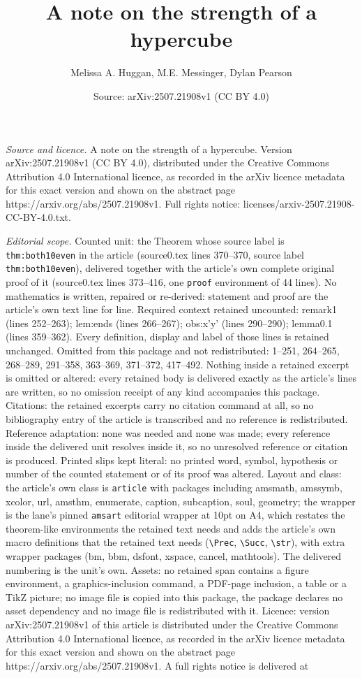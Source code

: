 \documentclass[10pt,a4paper]{amsart}
\title[A note on the strength of a hypercube]{A note on the strength of a hypercube}
\author{Melissa A. Huggan, M.E. Messinger, Dylan Pearson}
\date{Source: arXiv:2507.21908v1 (CC BY 4.0)}
\begin{document}
\maketitle

\noindent\emph{Source and licence.} A note on the strength of a hypercube. Version arXiv:2507.21908v1 (CC BY 4.0), distributed under the Creative Commons Attribution 4.0 International licence, as recorded in the arXiv licence metadata for this exact version and shown on the abstract page https://arxiv.org/abs/2507.21908v1. Full rights notice: licenses/arxiv-2507.21908-CC-BY-4.0.txt.\par\smallskip

\noindent\textit{Editorial scope.} Counted unit: the Theorem whose source label is \texttt{thm:both10even} in the article (source0.tex lines 370--370, source label \texttt{thm:both10even}), delivered together with the article's own complete original proof of it (source0.tex lines 373--416, one \texttt{proof} environment of 44 lines). No mathematics is written, repaired or re-derived: statement and proof are the article's own text line for line. Required context retained uncounted: remark1 (lines 252--263); lem:ends (lines 266--267); obs:x'y' (lines 290--290); lemma0.1 (lines 359--362). Every definition, display and label of those lines is retained unchanged. Omitted from this package and not redistributed: 1--251, 264--265, 268--289, 291--358, 363--369, 371--372, 417--492. Nothing inside a retained excerpt is omitted or altered: every retained body is delivered exactly as the article's lines are written, so no omission receipt of any kind accompanies this package. Citations: the retained excerpts carry no citation command at all, so no bibliography entry of the article is transcribed and no reference is redistributed. Reference adaptation: none was needed and none was made; every reference inside the delivered unit resolves inside it, so no unresolved reference or citation is produced. Printed slips kept literal: no printed word, symbol, hypothesis or number of the counted statement or of its proof was altered. Layout and class: the article's own class is \texttt{article} with packages including amsmath, amssymb, xcolor, url, amsthm, enumerate, caption, subcaption, soul, geometry; the wrapper is the lane's pinned \texttt{amsart} editorial wrapper at 10pt on A4, which restates the theorem-like environments the retained text needs and adds the article's own macro definitions that the retained text needs (\texttt{\textbackslash Prec}, \texttt{\textbackslash Succ}, \texttt{\textbackslash str}), with extra wrapper packages (bm, bbm, dsfont, xspace, cancel, mathtools). The delivered numbering is the unit's own. Assets: no retained span contains a figure environment, a graphics-inclusion command, a PDF-page inclusion, a table or a TikZ picture; no image file is copied into this package, the package declares no asset dependency and no image file is redistributed with it. Licence: version arXiv:2507.21908v1 of this article is distributed under the Creative Commons Attribution 4.0 International licence, as recorded in the arXiv licence metadata for this exact version and shown on the abstract page https://arxiv.org/abs/2507.21908v1. A full rights notice is delivered at 
\end{document}
